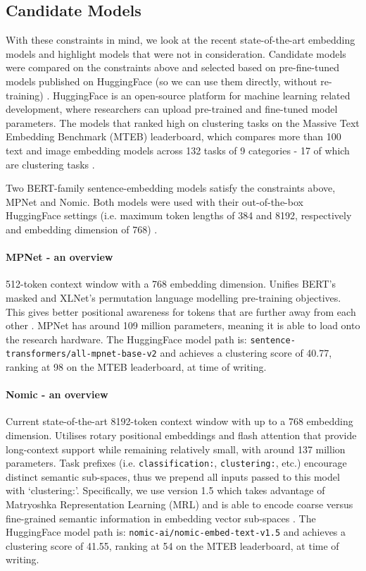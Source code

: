 \documentclass[10pt,oneside]{report}
\begin{document}
\subsection{Candidate Models}

With these constraints in mind, we look at the recent state-of-the-art embedding models and highlight models that were not in consideration. Candidate models were compared on the constraints above and selected based on pre-fine-tuned models published on HuggingFace (so we can use them directly, without re-training) \cite{wolf2019huggingface}. HuggingFace is an open-source platform for machine learning related development, where researchers can upload pre-trained and fine-tuned model parameters. The models that ranked high on clustering tasks on the Massive Text Embedding Benchmark (MTEB) leaderboard, which compares more than 100 text and image embedding models across 132 tasks of 9 categories - 17 of which are clustering tasks \cite{muennighoff2022mteb}. 

Two BERT-family sentence-embedding models satisfy the constraints above, MPNet and Nomic. Both models were used with their out-of-the-box HuggingFace settings (i.e. maximum token lengths of 384 and 8192, respectively and embedding dimension of 768) \cite{song2020mpnet, nussbaum2024nomic, nussbaum2024nomic1.5}.

\paragraph{MPNet - an overview}
512-token context window with a 768 embedding dimension. Unifies BERT's masked and XLNet's permutation language modelling pre-training objectives. This gives better positional awareness for tokens that are further away from each other \cite{song2020mpnet}. MPNet has around 109 million parameters, meaning it is able to load onto the research hardware. The HuggingFace model path is: \texttt{sentence-transformers/all-mpnet-base-v2} and achieves a clustering score of 40.77, ranking at 98 on the MTEB leaderboard, at time of writing.

\paragraph{Nomic - an overview}
Current state-of-the-art 8192-token context window with up to a 768 embedding dimension. Utilises rotary positional embeddings and flash attention that provide long-context support while remaining relatively small, with around 137 million parameters. Task prefixes (i.e. \texttt{classification:}, \texttt{clustering:}, etc.) encourage distinct semantic sub-spaces, thus we prepend all inputs passed to this model with `clustering:'. Specifically, we use version 1.5 which takes advantage of Matryoshka Representation Learning (MRL) and is able to encode coarse versus fine-grained semantic information in embedding vector sub-spaces \cite{nussbaum2024nomic, nussbaum2024nomic1.5}. The HuggingFace model path is: \texttt{nomic-ai/nomic-embed-text-v1.5} and achieves a clustering score of 41.55, ranking at 54 on the MTEB leaderboard, at time of writing.
\end{document}
